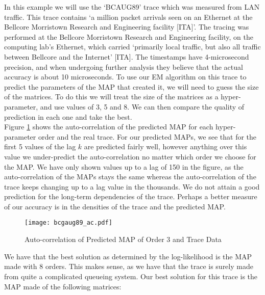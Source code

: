 \documentclass[a4paper,11pt,titlepage]{article}
\begin{document}
In this example we will use the `BCAUG89' trace which was measured from LAN traffic. This trace contains `a million packet arrivals seen on an Ethernet at the Bellcore Morristown Research and Engineering facility [ITA]'. The tracing was performed at the Bellcore Morristown Research and Engineering facility, on the computing lab's Ethernet, which carried `primarily local traffic, but also all traffic between Bellcore and the Internet' [ITA]. The timestamps have 4-microsecond precision, and when undergoing further analysis they believe that the actual accuracy is about 10 microseconds. To use our EM algorithm on this trace to predict the parameters of the MAP that created it, we will need to guess the size of the matrices. To do this we will treat the size of the matrices as a hyper-parameter, and use values of 3, 5 and 8. We can then compare the quality of prediction in each one and take the best. \\

Figure \ref{fig:bcaug_ac} shows the auto-correlation of the predicted MAP for each hyper-parameter order and the real trace. For our predicted MAPs, we see that for the first 5 values of the lag $k$ are predicted fairly well, however anything over this value we under-predict the auto-correlation no matter which order we choose for the MAP. We have only shown values up to a lag of 150 in the figure, as the auto-correlation of the MAPs stays the same whereas the auto-correlation of the trace keeps changing up to a lag value in the thousands. We do not attain a good prediction for the long-term dependencies of the trace. Perhaps a better measure of our accuracy is in the densities of the trace and the predicted MAP. 

\begin{figure}[h!]
\begin{center}
\texttt{[image: bcgaug89\_ac.pdf]}
\caption{Auto-correlation of Predicted MAP of Order 3 and Trace Data}
\label{fig:bcaug_ac}
\end{center}
\end{figure}

We have that the best solution as determined by the log-likelihood is the MAP made with 8 orders. This makes sense, as we have that the trace is surely made from quite a complicated queueing system. Our best solution for this trace is the MAP made of the following matrices: 
\end{document}
